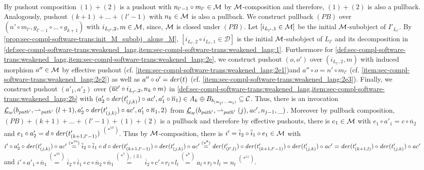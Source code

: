 \begin{enumerate}
By pushout composition $(1)+(2)$ is a pushout with $n_{l'-1}\circ m_{l'} \in {\cal M}$ by ${\cal M}$-composition and therefore, $(1)+(2)$ is also a pullback.
Analogously, pushout $(k+1)+\ldots +(l'-1)$ with $n_k \in {\cal M}$ is also a pullback.
We construct pullback $(PB)$ over $(n' \circ m_{l'},g_{l'-1} \circ \ldots \circ g_{k+1})$ with $i_{L_{l'},2},m \in {\cal M}$, since, ${\cal M}$ is closed under $(PB)$.
Let $[i_{L_{l'},1} \in {\cal M}]$ be the initial ${\cal M}$-subobject of $I'_{L_{l'}}$.
By \cref{prop:sec-compl-software-trans:init_M_subobj_along_M}, $[i_{L_{l'},2} \circ i_{L_{l'},1} \in \mathcal{D}]$ is the initial ${\cal M}$-subobject of $L_{l'}$ and its decomposition in \cref{def:sec-compl-software-trans:weakened_lang,item:sec-compl-software-trans:weakened_lang:1}.
Furthermore for \cref{def:sec-compl-software-trans:weakened_lang,item:sec-compl-software-trans:weakened_lang:2e}, we construct pushout $(o,o')$ over $(i_{L_{l'},2},m)$ with induced morphism $a'' \in {\cal M}$ by effective pushout (cf. \cref{item:sec-compl-software-trans:weakened_lang:2e1})and $a'' \circ o=n' \circ m_{l'}$ (cf. \cref{item:sec-compl-software-trans:weakened_lang:2e2}) as well as $a'' \circ o'=\mathit{der}(t)$ (cf. \cref{item:sec-compl-software-trans:weakened_lang:2e3}).
Finally, we construct pushout $(a'_1,a'_2)$ over $(\overline{\mathit{ac}}' \circ i_{L_{l'},2},n_k \circ m)$ in \cref{def:sec-compl-software-trans:weakened_lang,item:sec-compl-software-trans:weakened_lang:2b} with $(a'_2 \circ \mathit{der}(t'_{(j,k)}) \circ \mathit{ac}',a'_1 \circ \overline{n}_1) \in A_k \oplus B_{b_{(m_{l'}\ldots m_l)}} \subseteq \mathcal{C}$.
Thus, there is an invocation $\underline{\mathcal{L}}_w(b_{\mathit{path}'},\rightharpoonup_{\mathit{path}'}(l+1),a'_2 \circ \mathit{der}(t'_{(j,k)}) \circ \mathit{ac}',a'_1 \circ \overline{n}_1,2)$ from $\underline{\mathcal{L}}_w(b_{\mathit{path}'},\rightharpoonup_{\mathit{path}'}(j),\mathit{ac}',n_{j-1},\_)$.
Moreover by pullback composition, $(PB)+(k+1)+\ldots +(l'-1)+(1)+(2)$ is a pullback and therefore by effective pushouts, there is $e_1 \in {\cal M}$ with $e_1 \circ a'_1=c \circ \overline{n}_2$ and $e_1 \circ a'_2=d \circ \mathit{der}(t'_{(k+1,l'-1)})$ $^{(*^{10})}$.
Thus by ${\cal M}$-composition, there is $i'=\overline{i}_2 \circ \overline{i}_1 \circ e_1 \in {\cal M}$ with $i' \circ a'_2 \circ \mathit{der}(t'_{(j,k)}) \circ \mathit{ac}' \stackrel{(*^{10})}{=} \overline{i}_2 \circ \overline{i}_1 \circ d \circ \mathit{der}(t'_{(k+1,l'-1)}) \circ \mathit{der}(t'_{(j,k)}) \circ \mathit{ac}' \stackrel{(*^8)}{=} \mathit{der}(t'_{(l',l)}) \circ \mathit{der}(t'_{(k+1,l'-1)}) \circ \mathit{der}(t'_{(j,k)}) \circ \mathit{ac}'=\mathit{der}(t'_{(k+1,l)}) \circ \mathit{der}(t'_{(j,k)}) \circ \mathit{ac}'$ and $i' \circ a'_1 \circ \overline{n}_1 \stackrel{(*^{10})}{=} \overline{i}_2 \circ \overline{i}_1 \circ c \circ \overline{n}_2 \circ \overline{n}_1 \stackrel{(*^7),(3)}{=} \overline{i}_2 \circ c' \circ r_l \circ l_l \stackrel{(*^8)}{=} a_l \circ r_l \circ l_l=n_l$ $^{(*^{11})}$.

\end{enumerate}
